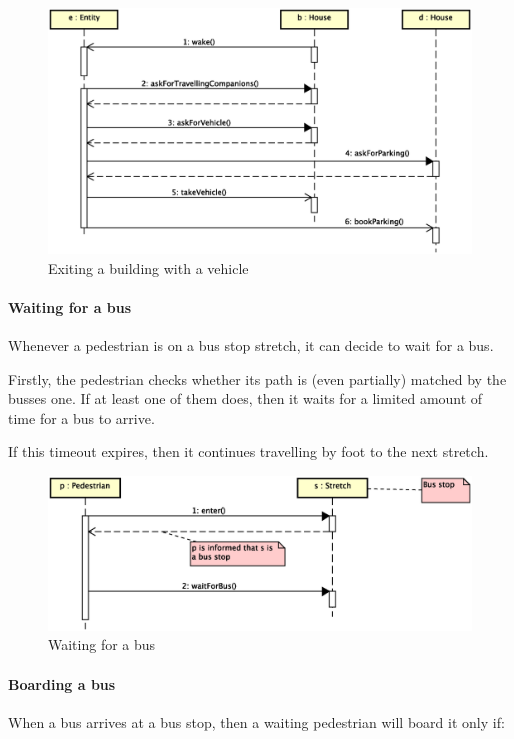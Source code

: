 \begin{figure}[H]
  \centering
  \includegraphics[width=\columnwidth,trim=1 0 0 0,clip]
    {images/solution/going_out_with_vehicle.eps}
  \caption{Exiting a building with a vehicle}
  \label{fig:app-inter-vehicle}
\end{figure}

\paragraph{Waiting for a bus} 
Whenever a pedestrian is on a bus stop stretch, 
it can decide to wait for a bus.

Firstly, the pedestrian checks whether its path is (even partially) 
matched by the busses one.
If at least one of them does, then it waits 
for a limited amount of time for a bus to arrive.

If this timeout expires, 
then it continues travelling by foot to the next stretch.

\begin{figure}[H]
  \centering
  \includegraphics[width=\columnwidth,trim=1 0 2 0,clip]
    {images/solution/bus_waiting.eps}
  \caption{Waiting for a bus}
  \label{fig:app-inter-wait-bus}
\end{figure}

\paragraph{Boarding a bus} When a bus arrives at a bus stop, then a waiting
pedestrian will board it only if:


